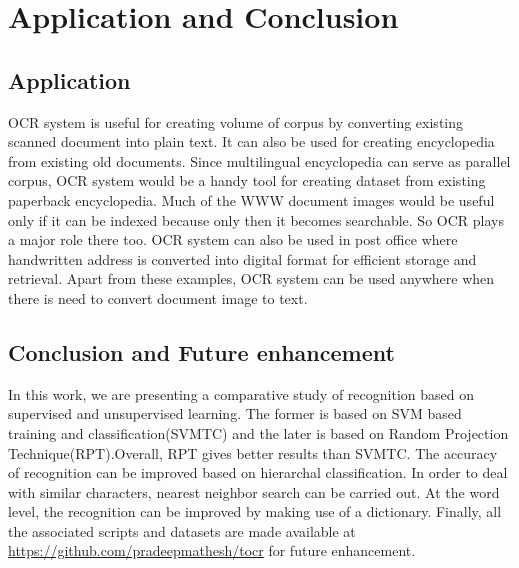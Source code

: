 \chapter{Application and Conclusion}


\section{Application}
OCR system is useful for creating volume of corpus by converting existing scanned document into 
plain text. It can also be used for creating encyclopedia from existing old documents. Since  
multilingual encyclopedia can serve as parallel corpus, OCR system would be a handy tool 
for creating dataset from existing paperback encyclopedia. Much of the WWW document images would be 
useful only if it can be indexed because only then it becomes searchable. So OCR plays a major 
role there too. OCR system can also be used in post office where handwritten address is converted into digital format for efficient storage and retrieval. Apart from these examples, OCR system can be 
used anywhere when there is need to convert document image to text.



\section{Conclusion and Future enhancement}
In this work, we are presenting a comparative study of recognition based on supervised and 
unsupervised learning.  The former is based on SVM based training and classification(SVMTC) and the
later is based on Random Projection Technique(RPT).Overall, RPT gives better results than
SVMTC. 
The accuracy of recognition can be improved based on hierarchal classification. In order to deal 
with similar characters, nearest neighbor search can be carried out. At the word level, the recognition
can be improved by making use of a dictionary. Finally, all the associated scripts and datasets are made available at \url{https://github.com/pradeepmathesh/tocr} for future enhancement.